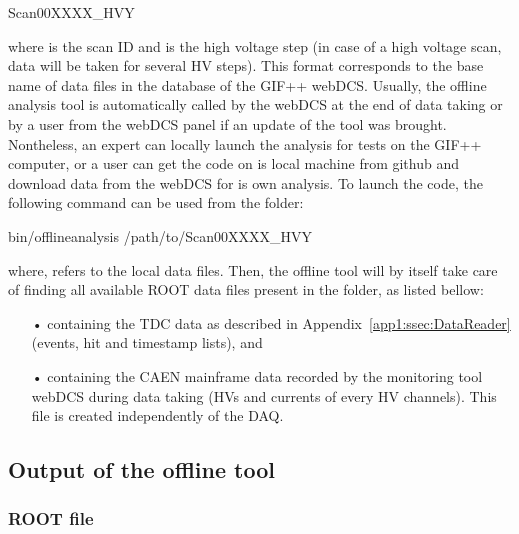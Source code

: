 	\begin{bashcode}
 Scan00XXXX_HVY
	\end{bashcode}
\vspace{5mm}
	where  is the scan ID and  is the high voltage step (in case of a high voltage scan, data will be taken for several HV steps). This format corresponds to the base name of data files in the database of the GIF++ webDCS. Usually, the offline analysis tool is automatically called by the webDCS at the end of data taking or by a user from the webDCS panel if an update of the tool was brought. Nontheless, an expert can locally launch the analysis for tests on the GIF++ computer, or a user can get the code on is local machine from github and download data from the webDCS for is own analysis. To launch the code, the following command can be used from the  folder:\\
	
	\begin{bashcode}
 bin/offlineanalysis /path/to/Scan00XXXX_HVY
	\end{bashcode}
\vspace{5mm}
	where,  refers to the local data files. Then, the offline tool will by itself take care of finding all available ROOT data files present in the folder, as listed bellow:

	\begin{itemize}
		\item[•]  containing the TDC data as described in Appendix~\ref{app1:ssec:DataReader} (events, hit and timestamp lists), and
		\item[•]  containing the CAEN mainframe data recorded by the monitoring tool webDCS during data taking (HVs and currents of every HV channels). This file is created independently of the DAQ.
	\end{itemize}
	
	\subsection{Output of the offline tool}
	\label{app2:ssec:output}
	
		\subsubsection{ROOT file}
		\label{app2:sssec:ROOT}
	
